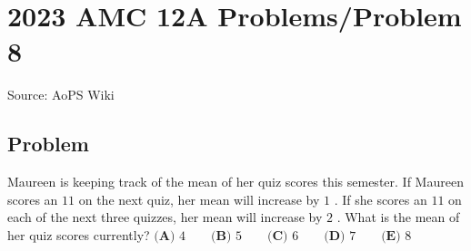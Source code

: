 \documentclass[12pt]{article}
\begin{document}
\section*{{2023 AMC 12A Problems/Problem 8}}
Source: AoPS Wiki

\subsection*{Problem}
Maureen is keeping track of the mean of her quiz scores this semester. If Maureen scores an $11$ on the next quiz, her mean will increase by $1$ . If she scores an $11$ on each of the next three quizzes, her mean will increase by $2$ . What is the mean of her quiz scores currently? $\textbf{(A) }4\qquad\textbf{(B) }5\qquad\textbf{(C) }6\qquad\textbf{(D) }7\qquad\textbf{(E) }8$
\end{document}
